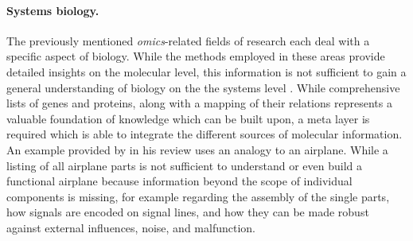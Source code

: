 
\paragraph{Systems biology.}

The previously mentioned {\em omics}-related fields of research each deal
with a specific aspect of biology.
While the methods employed in these areas provide detailed insights on the 
molecular level, this information is not sufficient to gain a general 
understanding of biology on the the systems level \citep{Kitano2002}.
While comprehensive lists of genes and proteins, along with a mapping
of their relations represents a valuable foundation of knowledge which can
be built upon, a meta layer is required which is able to integrate the
different sources of molecular information.
An example provided by \citeauthor{Kitano2002} in his review uses an analogy 
to an airplane.
While a listing of all airplane parts is not sufficient to understand or even
build a functional airplane because information beyond the scope of individual
components is missing, for example regarding the assembly of the single parts,
how signals are encoded on signal lines, and how they can be made robust against
external influences, noise, and malfunction.

